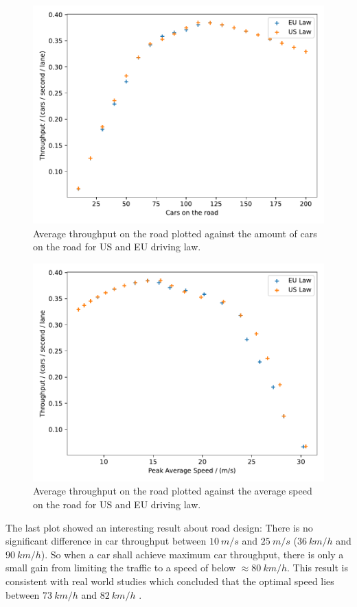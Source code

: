 \begin{figure}[H]
	\centering
	\includegraphics[width=0.9\linewidth]{media/throughput_cars.pdf}
	\caption{Average throughput on the road plotted against the amount of cars on the road for US and EU driving law.}
	\label{fig:throughput-cars}
\end{figure}

\begin{figure}[H]
	\centering
	\includegraphics[width=0.9\linewidth]{media/throughput_speed.pdf}
	\caption{Average throughput on the road plotted against the average speed on the road for US and EU driving law.}
	\label{fig:throughput-speed}
\end{figure}
The last plot showed an interesting result about road design: There is no significant difference in
car throughput between $\SI{10}{m/s}$ and $\SI{25}{m/s}$ ($\SI{36}{km/h}$ and $\SI{90}{km/h}$). So
when a car shall achieve maximum car throughput, there is only a small gain from limiting the
traffic to a speed of below $\approx \SI{80}{km/h}$. This result is consistent with real world
studies which concluded that the optimal speed lies between $\SI{73}{km/h}$ and $\SI{82}{km/h}$
\cite{HOSSEINLOU201536}.

